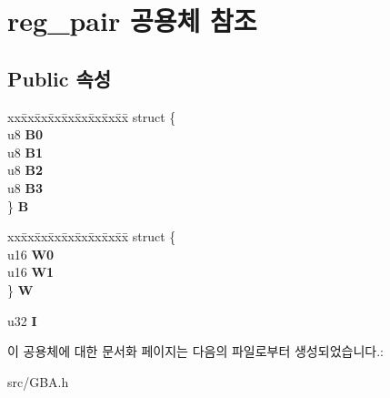 \hypertarget{unionreg__pair}{}\section{reg\+\_\+pair 공용체 참조}
\label{unionreg__pair}
\subsection*{Public 속성}
\begin{DoxyCompactItemize}
\item 
\mbox{\label{unionreg__pair_a4aa9f4a2c7db57ca409d6f6b1b9fad02}} 
\begin{tabbing}
xx\=xx\=xx\=xx\=xx\=xx\=xx\=xx\=xx\=\kill
struct \{\\
\>u8 {\bfseries B0}\\
\>u8 {\bfseries B1}\\
\>u8 {\bfseries B2}\\
\>u8 {\bfseries B3}\\
\} {\bfseries B}\\

\end{tabbing}\item 
\mbox{\label{unionreg__pair_aaa63aa528e9ef659bfefa9ae70aa05b0}} 
\begin{tabbing}
xx\=xx\=xx\=xx\=xx\=xx\=xx\=xx\=xx\=\kill
struct \{\\
\>u16 {\bfseries W0}\\
\>u16 {\bfseries W1}\\
\} {\bfseries W}\\

\end{tabbing}\item 
\mbox{\label{unionreg__pair_a9f6a42d56c07829d7013571eda998252}} 
u32 {\bfseries I}
\end{DoxyCompactItemize}


이 공용체에 대한 문서화 페이지는 다음의 파일로부터 생성되었습니다.\+:\begin{DoxyCompactItemize}
\item 
src/G\+B\+A.\+h\end{DoxyCompactItemize}
